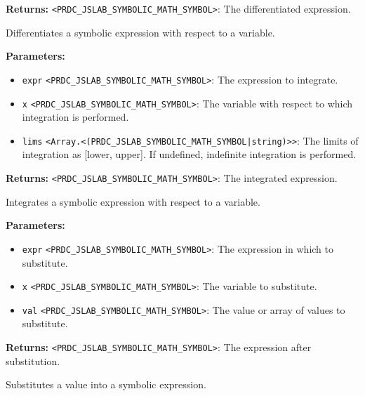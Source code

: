 \documentclass[12pt,a4paper]{article}
\begin{document}
\noindent \textbf{Returns:} \texttt{<PRDC\_JSLAB\_SYMBOLIC\_MATH\_SYMBOL>}: The differentiated expression.

\noindent Differentiates a symbolic expression with respect to a variable.

\vspace{5mm}
\noindent {}


\noindent \textbf{Parameters:}
\begin{itemize}
  \item \texttt{expr} \texttt{<PRDC\_JSLAB\_SYMBOLIC\_MATH\_SYMBOL>}: The expression to integrate.
  \item \texttt{x} \texttt{<PRDC\_JSLAB\_SYMBOLIC\_MATH\_SYMBOL>}: The variable with respect to which integration is performed.
  \item \texttt{lims} \texttt{<Array.<(PRDC\_JSLAB\_SYMBOLIC\_MATH\_SYMBOL|string)>>}: The limits of integration as [lower, upper]. If undefined, indefinite integration is performed.
\end{itemize}

\noindent \textbf{Returns:} \texttt{<PRDC\_JSLAB\_SYMBOLIC\_MATH\_SYMBOL>}: The integrated expression.

\noindent Integrates a symbolic expression with respect to a variable.

\vspace{5mm}
\noindent {}


\noindent \textbf{Parameters:}
\begin{itemize}
  \item \texttt{expr} \texttt{<PRDC\_JSLAB\_SYMBOLIC\_MATH\_SYMBOL>}: The expression in which to substitute.
  \item \texttt{x} \texttt{<PRDC\_JSLAB\_SYMBOLIC\_MATH\_SYMBOL>}: The variable to substitute.
  \item \texttt{val} \texttt{<PRDC\_JSLAB\_SYMBOLIC\_MATH\_SYMBOL>}: The value or array of values to substitute.
\end{itemize}

\noindent \textbf{Returns:} \texttt{<PRDC\_JSLAB\_SYMBOLIC\_MATH\_SYMBOL>}: The expression after substitution.

\noindent Substitutes a value into a symbolic expression.
\end{document}
